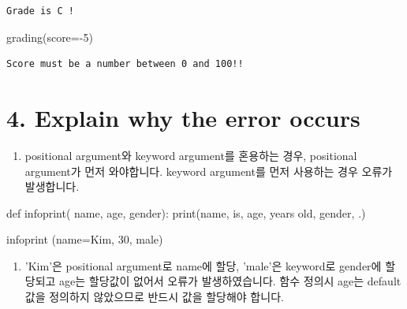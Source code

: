 \documentclass[
  letterpaper,
  DIV=11,
  numbers=noendperiod]{scrreprt}
\newenvironment{Shaded}{\begin{snugshade}}{\end{snugshade}}
\newcommand{\BuiltInTok}[1]{\textcolor[rgb]{0.00,0.23,0.31}{#1}}
\newcommand{\DecValTok}[1]{\textcolor[rgb]{0.68,0.00,0.00}{#1}}
\newcommand{\KeywordTok}[1]{\textcolor[rgb]{0.00,0.23,0.31}{#1}}
\newcommand{\NormalTok}[1]{\textcolor[rgb]{0.00,0.23,0.31}{#1}}
\newcommand{\OperatorTok}[1]{\textcolor[rgb]{0.37,0.37,0.37}{#1}}
\newcommand{\StringTok}[1]{\textcolor[rgb]{0.13,0.47,0.30}{#1}}
\providecommand{\tightlist}{%
  \setlength{\itemsep}{0pt}\setlength{\parskip}{0pt}}\usepackage{longtable,booktabs,array}
\begin{document}
\begin{verbatim}
Grade is C !
\end{verbatim}

\begin{Shaded}
\begin{Highlighting}[]
\NormalTok{grading(score}\OperatorTok{={-}}\DecValTok{5}\NormalTok{)}
\end{Highlighting}
\end{Shaded}

\begin{verbatim}
Score must be a number between 0 and 100!!
\end{verbatim}

\section*{4. Explain why the error
occurs}\label{explain-why-the-error-occurs}


\begin{enumerate}
\def\labelenumi{(\arabic{enumi})}
\tightlist
\item
  positional argument와 keyword argument를 혼용하는 경우, positional
  argument가 먼저 와야합니다. keyword argument를 먼저 사용하는 경우
  오류가 발생합니다.
\end{enumerate}

\begin{Shaded}
\begin{Highlighting}[]
\KeywordTok{def}\NormalTok{ infoprint( name, age, gender):}
    \BuiltInTok{print}\NormalTok{(name, }\StringTok{\textquotesingle{}is\textquotesingle{}}\NormalTok{, age, }\StringTok{\textquotesingle{}years old\textquotesingle{}}\NormalTok{, gender, }\StringTok{\textquotesingle{}.\textquotesingle{}}\NormalTok{)}

\NormalTok{infoprint (name}\OperatorTok{=}\StringTok{\textquotesingle{}Kim\textquotesingle{}}\NormalTok{, }\DecValTok{30}\NormalTok{, }\StringTok{\textquotesingle{}male\textquotesingle{}}\NormalTok{)}
\end{Highlighting}
\end{Shaded}

\begin{enumerate}
\def\labelenumi{(\arabic{enumi})}
\setcounter{enumi}{1}
\tightlist
\item
  'Kim'은 positional argument로 name에 할당, 'male'은 keyword로 gender에
  할당되고 age는 할당값이 없어서 오류가 발생하였습니다. 함수 정의시
  age는 default값을 정의하지 않았으므로 반드시 값을 할당해야 합니다.
\end{enumerate}
\end{document}
